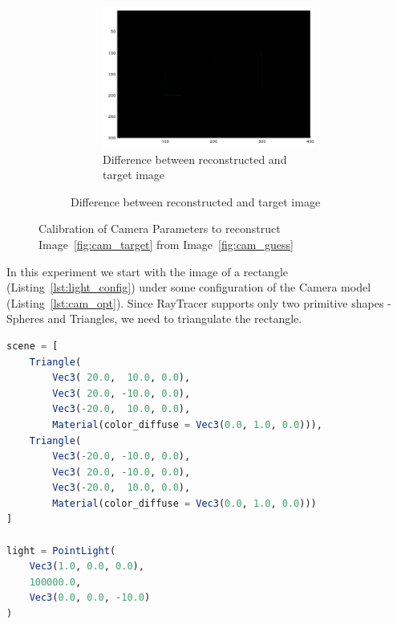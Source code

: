 \documentclass{juliacon}
\begin{document}
\begin{figure}[!htb]
\begin{subfigure}[c]{0.45\textwidth}
\begin{subfigure}[c]{0.45\textwidth}
            \includegraphics[width=\textwidth]{images/camera/diff.png}
            \caption{Difference between reconstructed and target image}
        \end{subfigure}
    \end{subfigure}
    \caption{Calibration of Camera Parameters to reconstruct Image~\ref{fig:cam_target} from Image~\ref{fig:cam_guess}}
    \label{fig:cam_invrender}
\end{figure}

In this experiment we start with the image of a rectangle (Listing~\ref{lst:light_config}) under some configuration of the Camera model (Listing~\ref{lst:cam_opt}). Since RayTracer supports only two primitive shapes - Spheres and Triangles, we need to triangulate the rectangle.

\begin{lstlisting}[caption = {Configuration of the Scene for Experiment~\ref{sec:calcam}},
                   label = {lst:light_config},
                   captionpos = b,
                   language = Julia]
scene = [
    Triangle(
        Vec3( 20.0,  10.0, 0.0),
        Vec3( 20.0, -10.0, 0.0),
        Vec3(-20.0,  10.0, 0.0),
        Material(color_diffuse = Vec3(0.0, 1.0, 0.0))),
    Triangle(
        Vec3(-20.0, -10.0, 0.0),
        Vec3( 20.0, -10.0, 0.0),
        Vec3(-20.0,  10.0, 0.0),
        Material(color_diffuse = Vec3(0.0, 1.0, 0.0)))
]

light = PointLight(
    Vec3(1.0, 0.0, 0.0),
    100000.0,
    Vec3(0.0, 0.0, -10.0)
)
\end{lstlisting}
\end{document}
